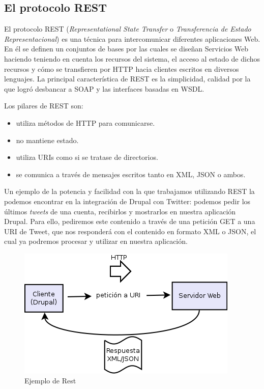 \subsection{El protocolo REST}
El protocolo REST (\textit{Representational State Transfer} o \textit{Transferencia de Estado Representacional}) 
es una técnica para intercomunicar diferentes aplicaciones Web. En él se definen un conjuntos de bases por las cuales
se diseñan Servicios Web haciendo teniendo en cuenta los recursos del sistema, el acceso al estado de dichos 
recursos y cómo se transfieren por HTTP hacia clientes escritos en diversos lenguajes. La principal 
característica de REST es la simplicidad, calidad por la que logró desbancar a SOAP y las interfaces basadas 
en WSDL.

Los pilares de REST son:

\begin{itemize}
  \item utiliza métodos de HTTP para comunicarse.
  \item no mantiene estado.
  \item utiliza URIs como si se tratase de directorios.
  \item se comunica a través de mensajes escritos tanto en XML, JSON o ambos.
\end{itemize}

Un ejemplo de la potencia y facilidad con la que trabajamos utilizando REST la podemos encontrar en la integración 
de Drupal con Twitter: podemos pedir los últimos \textit{tweets} de una cuenta, recibirlos y mostrarlos en 
nuestra aplicación Drupal. Para ello, pediremos este contenido a través de una petición GET a una URI 
de Tweet, que nos responderá con el contenido en formato XML o JSON, el cual ya podremos procesar y 
utilizar en nuestra aplicación. 
 
\begin{figure}
  \centering
    \includegraphics{Assets/Introduccion/Imagenes/diagrama_servicios_web.png}
  \caption{Ejemplo de Rest}
\end{figure}

